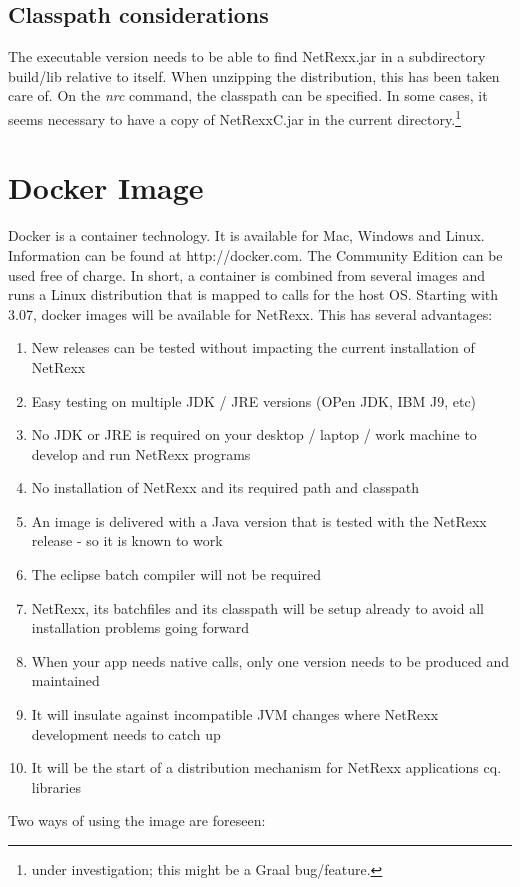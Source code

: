 \subsection{Classpath considerations}
The executable version needs to be able to find NetRexx.jar in a subdirectory build/lib relative to itself. When unzipping the distribution, this has been taken care of. On the \emph{nrc} command, the classpath can be specified. In some cases, it seems necessary to have a copy of NetRexxC.jar in the current directory.\footnote{under investigation; this might be a Graal bug/feature.}
\section{Docker Image}
Docker is a container technology. It is available for Mac, Windows and Linux. Information can be found at http://docker.com.
The Community Edition can be used free of charge.
In short, a container is combined from several images and runs a Linux distribution that is mapped to calls for the host OS.
Starting with 3.07, docker images will be available for NetRexx. This has several advantages:
\begin{enumerate}
\item New releases can be tested without impacting the current installation of NetRexx
\item Easy testing on multiple JDK / JRE versions (OPen JDK, IBM J9, etc)
\item No JDK or JRE is required on your desktop / laptop / work machine to develop and run NetRexx programs
\item No installation of NetRexx and its required path and classpath 
\item An image is delivered with a Java version that is tested with the NetRexx release - so it is known to work
\item The eclipse batch compiler will not be required
\item NetRexx, its batchfiles and its classpath will be setup already to avoid all installation problems going forward
\item When your app needs native calls, only one version needs to be produced and maintained
\item It will insulate against incompatible JVM changes where NetRexx development needs to catch up
\item It will be the start of a distribution mechanism for NetRexx applications cq. libraries
\end{enumerate}
Two ways of using the image are foreseen:
